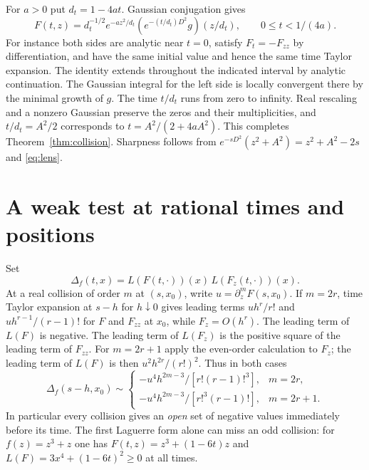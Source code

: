 \documentclass[11pt,a4paper]{article}
\numberwithin{equation}{section}
\begin{document}
For $a>0$ put $d_t=1-4at$. Gaussian conjugation gives
\begin{equation}\label{eq:lens}
 F(t,z)=d_t^{-1/2} e^{-az^2/d_t}
          (e^{-(t/d_t)D^2}g)(z/d_t),\qquad 0\le t<1/(4a).
\end{equation}
For instance both sides are analytic near $t=0$, satisfy
$F_t=-F_{zz}$ by differentiation, and have the same initial value and hence the same time Taylor expansion. The identity extends throughout the indicated interval by analytic
continuation. The Gaussian integral for the
left side is locally convergent there by the minimal growth of $g$.
The time $t/d_t$ runs from zero to infinity. Real rescaling and a
nonzero Gaussian preserve the zeros and their multiplicities, and
$t/d_t=A^2/2$ corresponds to $t=A^2/(2+4aA^2)$.
This completes Theorem~\ref{thm:collision}. Sharpness follows
from $e^{-sD^2}(z^2+A^2)=z^2+A^2-2s$ and \eqref{eq:lens}.

\section{A weak test at rational times and positions}\label{sect:weak}
Set
\[
 \Delta_f(t,x)=L(F(t,\cdot))(x)\,L(F_z(t,\cdot))(x).
\]
At a real collision of order $m$ at $(s,x_0)$, write
$u=\partial_z^mF(s,x_0)$. If $m=2r$, time Taylor expansion at $s-h$
for $h\downarrow0$ gives leading terms $u h^r/r!$ and
$u h^{r-1}/(r-1)!$ for $F$ and $F_{zz}$ at $x_0$, while $F_z=O(h^r)$.
The leading term of $L(F)$ is negative. The leading term of
$L(F_z)$ is the positive square of the leading term of $F_{zz}$.
For $m=2r+1$ apply the even-order calculation to $F_z$; the leading
term of $L(F)$ is then $u^2h^{2r}/(r!)^2$. Thus in both cases
\begin{equation}\label{eq:parity}
 \Delta_f(s-h,x_0)\sim
 \begin{cases}
 -u^4 h^{2m-3}/[r!(r-1)!^3],&m=2r,\\
 -u^4 h^{2m-3}/[r!^3(r-1)!],&m=2r+1.
 \end{cases}
\end{equation}
In particular every collision gives an \emph{open} set of negative
values immediately before its time. The first Laguerre form alone
can miss an odd collision: for $f(z)=z^3+z$ one has
$F(t,z)=z^3+(1-6t)z$ and $L(F)=3x^4+(1-6t)^2\ge0$ at all times.
\end{document}
